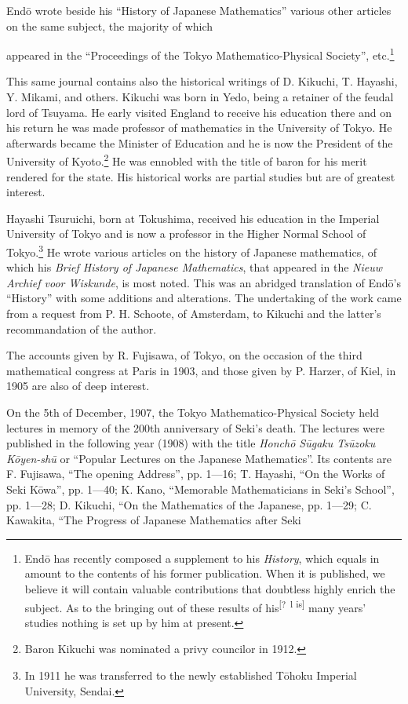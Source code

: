 \documentclass[11pt]{article}
\newcommand{\scanpage}[2]{\clearpage\setcounter{footnote}{0}\noindent{\footnotesize\color{gray}PDF page #1 · #2}\par\medskip}
\newcommand{\unclear}[1]{\textsuperscript{[?~#1]}}
\begin{document}
Endō wrote beside his ``History of Japanese Mathematics'' various other articles on the same subject, the majority of which

\scanpage{0343}{printed page 329}
\noindent appeared in the ``Proceedings of the Tokyo Mathematico-Physical Society'', etc.\footnote{Endō has recently composed a supplement to his \emph{History}, which equals in amount to the contents of his former publication. When it is published, we believe it will contain valuable contributions that doubtless highly enrich the subject. As to the bringing out of these results of his\unclear{l is} many years' studies nothing is set up by him at present.}

This same journal contains also the historical writings of D. Kikuchi, T. Hayashi, Y. Mikami, and others. Kikuchi was born in Yedo, being a retainer of the feudal lord of Tsuyama. He early visited England to receive his education there and on his return he was made professor of mathematics in the University of Tokyo. He afterwards became the Minister of Education and he is now the President of the University of Kyoto.\footnote{Baron Kikuchi was nominated a privy councilor in 1912.} He was ennobled with the title of baron for his merit rendered for the state. His historical works are partial studies but are of greatest interest.

Hayashi Tsuruichi, born at Tokushima, received his education in the Imperial University of Tokyo and is now a professor in the Higher Normal School of Tokyo.\footnote{In 1911 he was transferred to the newly established Tōhoku Imperial University, Sendai.} He wrote various articles on the history of Japanese mathematics, of which his \emph{Brief History of Japanese Mathematics}, that appeared in the \emph{Nieuw Archief voor Wiskunde}, is most noted. This was an abridged translation of Endō's ``History'' with some additions and alterations. The undertaking of the work came from a request from P. H. Schoote, of Amsterdam, to Kikuchi and the latter's recommandation of the author.

The accounts given by R. Fujisawa, of Tokyo, on the occasion of the third mathematical congress at Paris in 1903, and those given by P. Harzer, of Kiel, in 1905 are also of deep interest.

On the 5th of December, 1907, the Tokyo Mathematico-Physical Society held lectures in memory of the 200th anniversary of Seki's death. The lectures were published in the following year (1908) with the title \emph{Honchō Sūgaku Tsūzoku Kōyen-shū} or ``Popular Lectures on the Japanese Mathematics''. Its contents are F. Fujisawa, ``The opening Address'', pp. 1---16; T. Hayashi, ``On the Works of Seki Kōwa'', pp. 1---40; K. Kano, ``Memorable Mathematicians in Seki's School'', pp. 1---28; D. Kikuchi, ``On the Mathematics of the Japanese, pp. 1---29; C. Kawakita, ``The Progress of Japanese Mathematics after Seki
\end{document}
